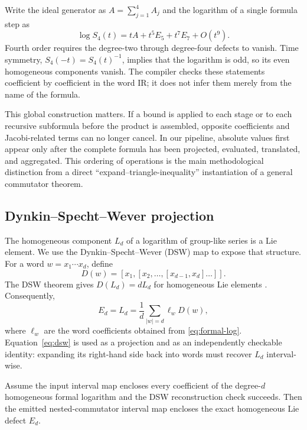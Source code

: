 Write the ideal generator as $A=\sum_{j=1}^{4}A_j$ and the logarithm of a
single formula step as
\begin{equation}
  \log S_4(t)=tA+t^5E_5+t^7E_7+O(t^9).
  \label{eq:symmetric-log}
\end{equation}
Fourth order requires the degree-two through degree-four defects to vanish.
Time symmetry, $S_4(-t)=S_4(t)^{-1}$, implies that the logarithm is odd, so its
even homogeneous components vanish.  The compiler checks these statements
coefficient by coefficient in the word IR; it does not infer them merely from
the name of the formula.

This global construction matters.  If a bound is applied to each stage or to
each recursive subformula before the product is assembled, opposite
coefficients and Jacobi-related terms can no longer cancel.  In our pipeline,
absolute values first appear only after the complete formula has been
projected, evaluated, translated, and aggregated.  This ordering of
operations is the main methodological distinction from a direct
``expand--triangle-inequality'' instantiation of a general commutator theorem.

\subsection{Dynkin--Specht--Wever projection}

The homogeneous component $L_d$ of a logarithm of group-like series is a Lie
element.  We use the Dynkin--Specht--Wever (DSW) map to expose that structure.
For a word $w=x_1\cdots x_d$, define
\begin{equation}
  D(w)=[x_1,[x_2,\ldots,[x_{d-1},x_d]\ldots]].
\end{equation}
The DSW theorem gives $D(L_d)=dL_d$ for homogeneous Lie elements
\citep{reutenauer1993free}.  Consequently,
\begin{equation}
  E_d=L_d=\frac{1}{d}\sum_{|w|=d}\ell_w D(w),
  \label{eq:dsw}
\end{equation}
where $\ell_w$ are the word coefficients obtained from \cref{eq:formal-log}.
Equation~\eqref{eq:dsw} is used as a projection and as an independently
checkable identity: expanding its right-hand side back into words must recover
$L_d$ interval-wise.

\begin{proposition}
\label{prop:lie-pass}
Assume the input interval map encloses every coefficient of the degree-$d$
homogeneous formal logarithm and the DSW reconstruction check succeeds.  Then
the emitted nested-commutator interval map encloses the exact homogeneous Lie
defect $E_d$.
\end{proposition}

